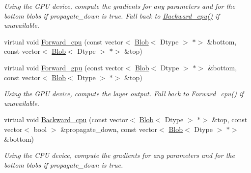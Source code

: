 \begin{DoxyCompactItemize}
\begin{DoxyCompactList}\small\item\em Using the G\+PU device, compute the gradients for any parameters and for the bottom blobs if propagate\+\_\+down is true. Fall back to \mbox{\hyperlink{classcaffe_1_1_scale_layer_a4b41188afeb445da06721fdf80526cf0}{Backward\+\_\+cpu()}} if unavailable. \end{DoxyCompactList}\item 
virtual void \mbox{\hyperlink{classcaffe_1_1_scale_layer_ade35e0412d540efa96ec7b45c9a7134d}{Forward\+\_\+cpu}} (const vector$<$ \mbox{\hyperlink{classcaffe_1_1_blob}{Blob}}$<$ Dtype $>$ $\ast$$>$ \&bottom, const vector$<$ \mbox{\hyperlink{classcaffe_1_1_blob}{Blob}}$<$ Dtype $>$ $\ast$$>$ \&top)
\item 
\mbox{\label{classcaffe_1_1_scale_layer_abff4005ecb550f54dc86f163ca9f26db}} 
virtual void \mbox{\hyperlink{classcaffe_1_1_scale_layer_abff4005ecb550f54dc86f163ca9f26db}{Forward\+\_\+gpu}} (const vector$<$ \mbox{\hyperlink{classcaffe_1_1_blob}{Blob}}$<$ Dtype $>$ $\ast$$>$ \&bottom, const vector$<$ \mbox{\hyperlink{classcaffe_1_1_blob}{Blob}}$<$ Dtype $>$ $\ast$$>$ \&top)
\begin{DoxyCompactList}\small\item\em Using the G\+PU device, compute the layer output. Fall back to \mbox{\hyperlink{classcaffe_1_1_scale_layer_a517d8eb2816c79daa1454ef5c7de065b}{Forward\+\_\+cpu()}} if unavailable. \end{DoxyCompactList}\item 
\mbox{\label{classcaffe_1_1_scale_layer_a4dd8e94791e8a2d95047f0f53ac6e2d4}} 
virtual void \mbox{\hyperlink{classcaffe_1_1_scale_layer_a4dd8e94791e8a2d95047f0f53ac6e2d4}{Backward\+\_\+cpu}} (const vector$<$ \mbox{\hyperlink{classcaffe_1_1_blob}{Blob}}$<$ Dtype $>$ $\ast$$>$ \&top, const vector$<$ bool $>$ \&propagate\+\_\+down, const vector$<$ \mbox{\hyperlink{classcaffe_1_1_blob}{Blob}}$<$ Dtype $>$ $\ast$$>$ \&bottom)
\begin{DoxyCompactList}\small\item\em Using the C\+PU device, compute the gradients for any parameters and for the bottom blobs if propagate\+\_\+down is true. \end{DoxyCompactList}\item 
\mbox{\label{classcaffe_1_1_scale_layer_aa0a2e96ec16cc61a2d8a9d47b729bee4}} 

\end{DoxyCompactItemize}
